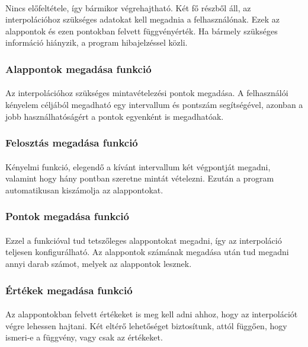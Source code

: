 \documentclass[12pt]{report}
\begin{document}
\paragraph{}
Nincs előfeltétele, így bármikor végrehajtható. Két fő részből áll, az interpolációhoz szükséges adatokat kell megadnia a felhasználónak. Ezek az alappontok és ezen pontokban felvett függvényérték. Ha bármely szükséges információ hiányzik, a program hibajelzéssel közli.
\subsubsection{Alappontok megadása funkció}
\paragraph{}
Az interpolációhoz szükséges mintavételezési pontok megadása. A felhasználói kényelem céljából megadható egy intervallum és pontszám segítségével, azonban a jobb használhatóságért a pontok egyenként is megadhatóak.
\subsubsection{Felosztás megadása funkció}
\paragraph{}
Kényelmi funkció, elegendő a kívánt intervallum két végpontját megadni, valamint hogy hány pontban szeretne mintát vételezni. Ezután a program automatikusan kiszámolja az alappontokat.
\subsubsection{Pontok megadása funkció}
\paragraph{}
Ezzel a funkcióval tud tetszőleges alappontokat megadni, így az interpoláció teljesen konfigurálható. Az alappontok számának megadása után tud megadni annyi darab számot, melyek az alappontok lesznek.
\subsubsection{Értékek megadása funkció}
\paragraph{}
Az alappontokban felvett értékeket is meg kell adni ahhoz, hogy az interpolációt végre lehessen hajtani. Két eltérő lehetőséget biztosítunk, attól függően, hogy ismeri-e a függvény, vagy csak az értékeket.
\end{document}
